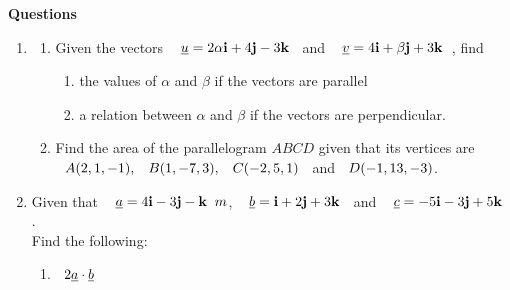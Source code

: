\documentclass[11pt,a4paper]{article}
\begin{document}
\textbf{Questions}
\begin{enumerate}
\item 
\begin{enumerate}
       \item Given the vectors $\hspace{0.3cm} \underline{u} = 2\alpha\textbf{i} + 4\textbf{j} - 3\textbf{k}\hspace{0.2cm}$ and $\hspace{0.3cm} \underline{v} = 4\textbf{i} + \beta\textbf{j} + 3\textbf{k}\hspace{0.2cm}$, find
\begin{enumerate}
            \item the values of $\alpha$ and $\beta$ if the vectors are parallel
            \item a relation between $\alpha$ and $\beta$ if the vectors are perpendicular.\\
\end{enumerate}


       \item Find the area of the parallelogram $ABCD$ given that its vertices are $\hspace{0.2cm} A(2,1,-1),\\ \hspace{0.3cm} B(1,-7,3),\hspace{0.3cm} C(-2,5,1)\hspace{0.2cm}$ and $\hspace{0.2cm} D(-1, 13, -3)$.\\
\end{enumerate}

\item Given that $\hspace{0.3cm} \underline{a} = 4\textbf{i} - 3\textbf{j} - \textbf{k}\hspace{0.2cm}m$, $\hspace{0.3cm} \underline{b} = \textbf{i} + 2\textbf{j} + 3\textbf{k}\hspace{0.2cm}$ and $\hspace{0.3cm} \underline{c} = -5\textbf{i} - 3\textbf{j} + 5\textbf{k}\hspace{0.2cm}$.\\

Find the following:
\begin{enumerate}
    \item $\hspace{0.2cm} 2\underline{a}\cdot \underline{b}$
    

\end{enumerate}
\end{enumerate}
\end{document}
